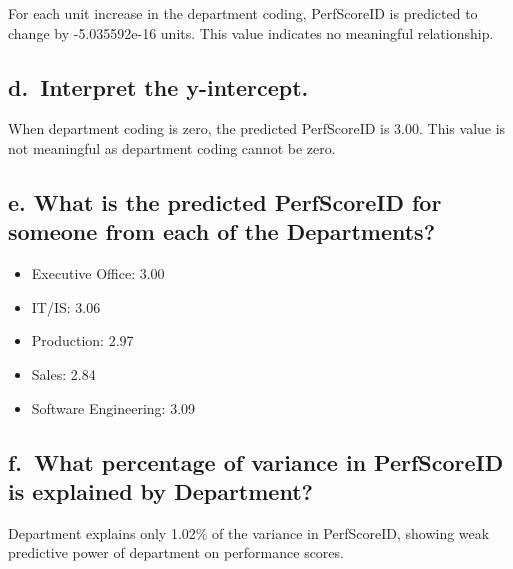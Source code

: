 \documentclass[
]{article}
\providecommand{\tightlist}{%
  \setlength{\itemsep}{0pt}\setlength{\parskip}{0pt}}
\begin{document}
For each unit increase in the department coding, PerfScoreID is
predicted to change by -5.035592e-16 units. This value indicates no
meaningful relationship.

\subsection{d.~Interpret the
y-intercept.}\label{d.-interpret-the-y-intercept.-1}

When department coding is zero, the predicted PerfScoreID is 3.00. This
value is not meaningful as department coding cannot be zero.

\subsection{e. What is the predicted PerfScoreID for someone from each
of the
Departments?}\label{e.-what-is-the-predicted-perfscoreid-for-someone-from-each-of-the-departments}

\begin{itemize}
\tightlist
\item
  Executive Office: 3.00
\item
  IT/IS: 3.06
\item
  Production: 2.97
\item
  Sales: 2.84
\item
  Software Engineering: 3.09
\end{itemize}

\subsection{f.~What percentage of variance in PerfScoreID is explained
by
Department?}\label{f.-what-percentage-of-variance-in-perfscoreid-is-explained-by-department}

Department explains only 1.02\% of the variance in PerfScoreID, showing
weak predictive power of department on performance scores.
\end{document}
